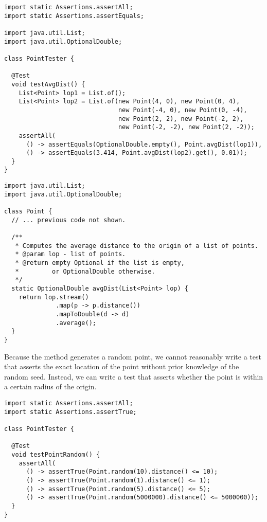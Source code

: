 \begin{lstlisting}[language=MyJava]
import static Assertions.assertAll;
import static Assertions.assertEquals;

import java.util.List;
import java.util.OptionalDouble;

class PointTester {

  @Test
  void testAvgDist() {
    List<Point> lop1 = List.of();
    List<Point> lop2 = List.of(new Point(4, 0), new Point(0, 4),
                               new Point(-4, 0), new Point(0, -4),
                               new Point(2, 2), new Point(-2, 2),
                               new Point(-2, -2), new Point(2, -2));
    assertAll(
      () -> assertEquals(OptionalDouble.empty(), Point.avgDist(lop1)),
      () -> assertEquals(3.414, Point.avgDist(lop2).get(), 0.01));
  }
}
\end{lstlisting}

\begin{lstlisting}[language=MyJava]
import java.util.List;
import java.util.OptionalDouble;

class Point {
  // ... previous code not shown. 

  /**
   * Computes the average distance to the origin of a list of points.
   * @param lop - list of points.
   * @return empty Optional if the list is empty, 
   *         or OptionalDouble otherwise.
   */
  static OptionalDouble avgDist(List<Point> lop) {
    return lop.stream()
              .map(p -> p.distance())
              .mapToDouble(d -> d)
              .average();
  }
}
\end{lstlisting}


Because the  method generates a random point, we cannot reasonably write a test that asserts the exact location of the point without prior knowledge of the random seed. 
Instead, we can write a test that asserts whether the point is within a certain radius of the origin. 

\enlargethispage{-2\baselineskip}
\begin{lstlisting}[language=MyJava]
import static Assertions.assertAll;
import static Assertions.assertTrue;

class PointTester {

  @Test
  void testPointRandom() {
    assertAll(
      () -> assertTrue(Point.random(10).distance() <= 10);
      () -> assertTrue(Point.random(1).distance() <= 1);
      () -> assertTrue(Point.random(5).distance() <= 5);
      () -> assertTrue(Point.random(5000000).distance() <= 5000000));
  }
}
\end{lstlisting}


